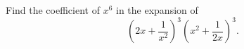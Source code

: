 Find the coefficient of $x^6$ in the expansion of
\[\left(2x+\dfrac{1}{x^2}\right)^3\left(x^2+\dfrac{1}{2x}\right)^3.\]
